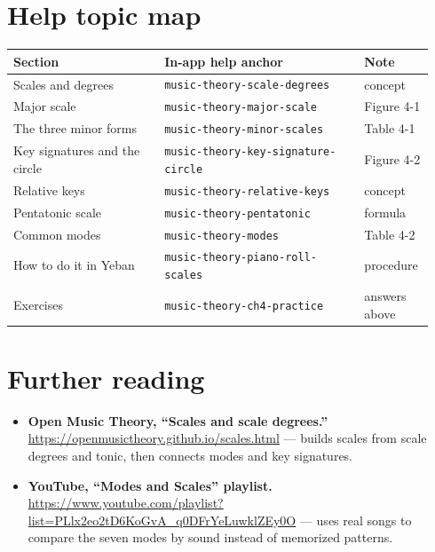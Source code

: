 \section{Help topic map}

\begin{center}
\footnotesize
\setlength{\tabcolsep}{3pt}
\begin{longtable}{p{0.34\linewidth}p{0.45\linewidth}p{0.15\linewidth}}
\toprule
Section & In-app help anchor & Note \\
\midrule
\endhead
Scales and degrees & \texttt{music-theory-scale-degrees} & concept \\
Major scale & \texttt{music-theory-major-scale} & Figure 4-1 \\
The three minor forms & \texttt{music-theory-minor-scales} & Table 4-1 \\
Key signatures and the circle & \texttt{music-theory-key-signature-circle} & Figure 4-2 \\
Relative keys & \texttt{music-theory-relative-keys} & concept \\
Pentatonic scale & \texttt{music-theory-pentatonic} & formula \\
Common modes & \texttt{music-theory-modes} & Table 4-2 \\
How to do it in Yeban & \texttt{music-theory-piano-roll-scales} & procedure \\
Exercises & \texttt{music-theory-ch4-practice} & answers above \\
\bottomrule
\end{longtable}
\end{center}

\section*{Further reading}
\begin{itemize}
  \item \textbf{Open Music Theory, “Scales and scale degrees.”} \url{https://openmusictheory.github.io/scales.html} — builds scales from scale degrees and tonic, then connects modes and key signatures.
  \item \textbf{YouTube, “Modes and Scales” playlist.} \url{https://www.youtube.com/playlist?list=PLlx2eo2tD6KoGvA_q0DFrYeLuwklZEy0O} — uses real songs to compare the seven modes by sound instead of memorized patterns.
\end{itemize}

